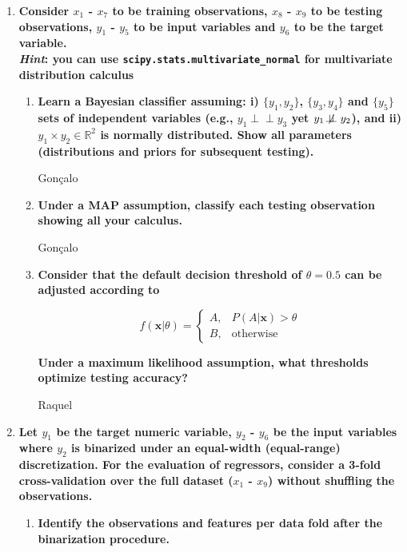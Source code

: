 \documentclass[12pt]{article}
\newcommand{\ind}{\perp\!\!\!\perp}
\begin{document}
\begin{enumerate}[leftmargin=\labelsep]
    \item \textbf{Consider $x_1$ - $x_7$ to be training observations, $x_8$ - $x_9$ to be testing observations, $y_1$ - $y_5$ to be input
          variables and $y_6$ to be the target variable.\\
          \textit{Hint}: you can use \texttt{scipy.stats.multivariate\_normal} for multivariate distribution calculus}
          \begin{enumerate}
          \item \textbf{Learn a Bayesian classifier assuming: i) $\{y_1, y_2\}$, $\{y_3, y_4\}$ and $\{y_5\}$ sets of independent
                variables (e.g., $y_1 \ind y_3$ yet $y_1 \not\!\ind y_2$), and ii) $y_1 \times y_2 \in \mathbb{R}^{2}$ is normally distributed. Show all
                parameters (distributions and priors for subsequent testing).}

          \vskip 0.3cm
          Gonçalo

          \item \textbf{Under a MAP assumption, classify each testing observation showing all your calculus.}

          \vskip 0.3cm
          Gonçalo

          \item \textbf{Consider that the default decision threshold of $\theta = 0.5$ can be adjusted according to}

                \[
                        f(\textbf{x}|\theta)=
                    \begin{cases}
                        A,& P(A|\textbf{x}) > \theta\\
                        B,& \text{otherwise}
                    \end{cases}
                \]

                \textbf{Under a maximum likelihood assumption, what thresholds optimize testing accuracy?}

          \vskip 0.3cm
          Raquel
          \end{enumerate}

    \item \textbf{Let $y_1$ be the target numeric variable, $y_2$ - $y_6$ be the input variables where $y_2$ is binarized under an
          equal-width (equal-range) discretization. For the evaluation of regressors, consider a 3-fold
          cross-validation over the full dataset ($x_1$ - $x_9$) without shuffling the observations.}
          \begin{enumerate}
          \item \textbf{Identify the observations and features per data fold after the binarization procedure.}


\end{enumerate}
\end{enumerate}
\end{document}
